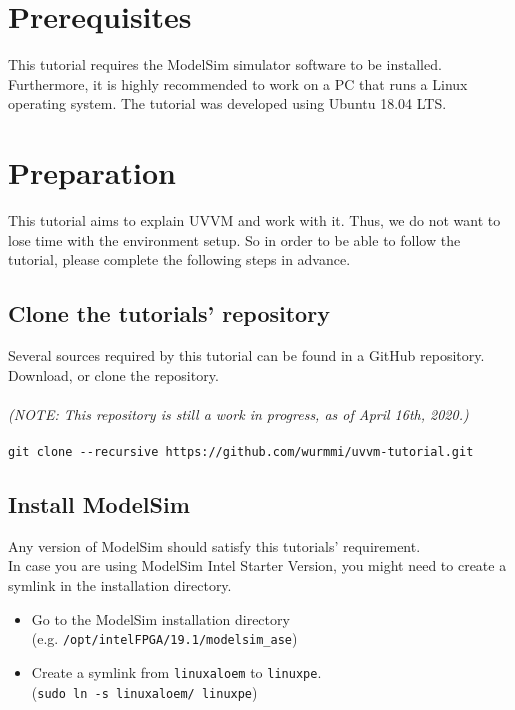 \section{Prerequisites}

This tutorial requires the ModelSim simulator software to be installed.
Furthermore, it is highly recommended to work on a PC that runs a Linux operating system. The tutorial was developed using Ubuntu 18.04 LTS.

\section{Preparation}

This tutorial aims to explain UVVM and work with it.
Thus, we do not want to lose time with the environment setup.
So in order to be able to follow the tutorial, please complete the
following steps in advance.

\subsection{Clone the tutorials' repository}

Several sources required by this tutorial can be found in a GitHub repository.\\
Download, or clone the repository.\\
\\
\textit{(NOTE: This repository is still a work in progress, as of April 16th, 2020.)}
\\
\\
\texttt{git clone -{}-recursive https://github.com/wurmmi/uvvm-tutorial.git }\\


\subsection{Install ModelSim}

Any version of ModelSim should satisfy this tutorials' requirement.\\

In case you are using ModelSim Intel Starter Version, you might need to
create a symlink in the installation directory.
\begin{itemize}
      \item Go to the ModelSim installation directory\\
            (e.g. \texttt{/opt/intelFPGA/19.1/modelsim\_ase})
      \item Create a symlink from \texttt{linuxaloem} to \texttt{linuxpe}.\\
            (\texttt{sudo ln -s linuxaloem/ linuxpe})
\end{itemize}

